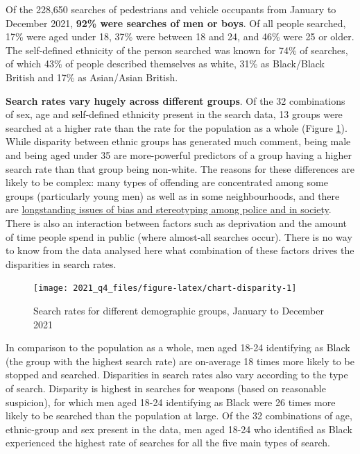 \documentclass[
  a4paper,
  twoside, 11pt]{article}
\begin{document}
Of the 228,650 searches of pedestrians and vehicle occupants from January to December 2021, \textbf{92\% were searches of men or boys}. Of all people searched, 17\% were aged under 18, 37\% were between 18 and 24, and 46\% were 25 or older. The self-defined ethnicity of the person searched was known for 74\% of searches, of which 43\% of people described themselves as white, 31\% as Black/Black British and 17\% as Asian/Asian British.

\textbf{Search rates vary hugely across different groups}. Of the 32 combinations of sex, age and self-defined ethnicity present in the search data, 13 groups were searched at a higher rate than the rate for the population as a whole (Figure \ref{fig:chart-disparity}). While disparity between ethnic groups has generated much comment, being male and being aged under 35 are more-powerful predictors of a group having a higher search rate than that group being non-white. The reasons for these differences are likely to be complex: many types of offending are concentrated among some groups (particularly young men) as well as in some neighbourhoods, and there are \href{https://www.bbc.co.uk/news/uk-47300343}{longstanding issues of bias and stereotyping among police and in society}. There is also an interaction between factors such as deprivation and the amount of time people spend in public (where almost-all searches occur). There is no way to know from the data analysed here what combination of these factors drives the disparities in search rates.



\begin{figure}[tb]

{\centering \texttt{[image: 2021\_q4\_files/figure-latex/chart-disparity-1]} 

}

\caption{Search rates for different demographic groups, January to December 2021}\label{fig:chart-disparity}
\end{figure}

In comparison to the population as a whole, men aged 18-24 identifying as Black (the group with the highest search rate) are on-average 18 times more likely to be stopped and searched. Disparities in search rates also vary according to the type of search. Disparity is highest in searches for weapons (based on reasonable suspicion), for which men aged 18-24 identifying as Black were 26 times more likely to be searched than the population at large. Of the 32 combinations of age, ethnic-group and sex present in the data, men aged 18-24 who identified as Black experienced the highest rate of searches for all the five main types of search.
\end{document}
